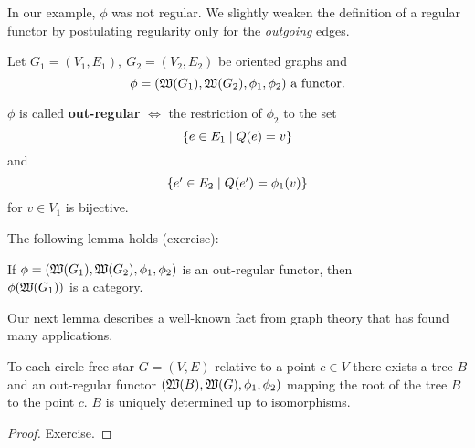 In our example, $\phi$ was not regular. We slightly weaken the definition of a
regular functor by postulating regularity only for the {\em outgoing} edges.

\bigskip
\begin{definition}
Let $G_1=(V_1,E_1),\ G_2=(V_2,E_2)$ be oriented graphs and
\[ \phi = (\mbox{$\mathfrak{W}({G_1})$}, \mbox{$\mathfrak{W}({G_2})$}, \phi_1, \phi_2)\text{ a functor.}
\]

$\phi$ is called {\bf out-regular} $\iff$ the restriction of $\phi_2$
to the set 
\[ \mbox{$\{e\in E_1 \mid Q(e) = v\}$} \] and \[ \mbox{$\{e' \in E_2 \mid
Q(e') = \phi_1(v)\}$} \]
for $v \in V_1$ is bijective.
\end{definition}

The following lemma holds (exercise):

\begin{lemma}
If $\phi = (\mbox{$\mathfrak{W}({G_1})$}, \mbox{$\mathfrak{W}({G_2})$}, \phi_1, \phi_2)$ is an out-regular
functor, then \\ $\phi(\mbox{$\mathfrak{W}({G_1})$})$ is a category.
\end{lemma}

Our next lemma describes a well-known fact from graph theory that has found many
applications.

\begin{lemma}
To each circle-free star $G = (V, E)$ relative to a point $c \in V$ there exists
a tree $B$ and an out-regular functor $(\mbox{$\mathfrak{W}({B})$}, \mbox{$\mathfrak{W}({G})$},
\phi_1, \phi_2)$ mapping the root of the tree $B$ to the point $c$. $B$ is 
uniquely determined up to isomorphisms.
\end{lemma}

\begin{proof}
Exercise.
\end{proof}


